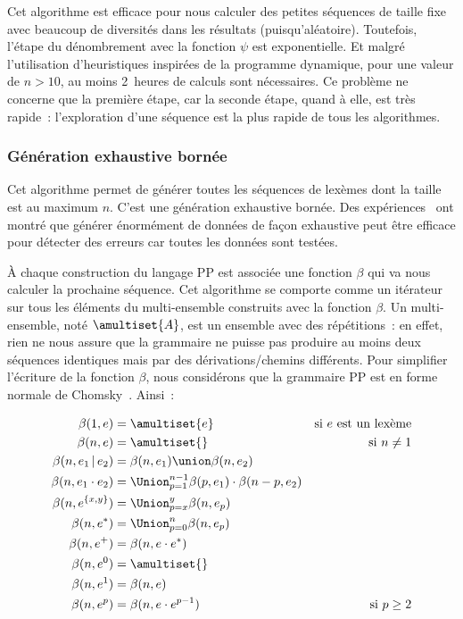 Cet algorithme est efficace pour nous calculer des petites séquences de taille
fixe avec beaucoup de diversités dans les résultats (puisqu'aléatoire).
Toutefois, l'étape du dénombrement avec la fonction $\psi$ est exponentielle. Et
malgré l'utilisation d'heuristiques inspirées de la programme dynamique, pour
une valeur de $n > 10$, au moins 2~heures de calculs sont nécessaires. Ce
problème ne concerne que la première étape, car la seconde étape, quand à elle,
est très rapide~: l'exploration d'une séquence est la plus rapide de tous les
algorithmes.

\subsubsection{Génération exhaustive bornée}
\label{subsection:data:bounded_exhaustive_generation}

Cet algorithme permet de générer toutes les séquences de lexèmes dont la taille
est au maximum $n$. C'est une génération exhaustive bornée. Des
expériences~ ont montré que générer énormément
de données de façon exhaustive peut être efficace pour détecter des erreurs car
toutes les données sont testées.

À chaque construction du langage PP est associée une fonction $\beta$ qui va
nous calculer la prochaine séquence. Cet algorithme se comporte comme un
itérateur sur tous les éléments du multi-ensemble construits avec la fonction
$\beta$. Un multi-ensemble, noté $\amultiset{A}$, est un ensemble avec des
répétitions~: en effet, rien ne nous assure que la grammaire ne puisse pas
produire au moins deux séquences identiques mais par des dérivations/chemins
différents. Pour simplifier l'écriture de la fonction $\beta$, nous considérons
que la grammaire PP est en forme normale de Chomsky~. Ainsi~:

\begin{align*}
%
\beta(1, e) & =
    \amultiset{e}
    &
    \text{si $e$ est un lexème}
    \\
%
\beta(n, e) & =
    \amultiset{}
    &
    \text{si $n \neq 1$}
    \\
%
\beta(n, e_1 \,\vert\, e_2) & =
    \beta(n, e_1) \union \beta(n, e_2)
    \\
%
\beta(n, e_1 \cdot e_2) & =
    \Union_{p = 1}^{n - 1}
    \beta(p, e_1) \cdot \beta(n - p, e_2)
    \\
%
\beta(n, e^{\{x, y\}}) & =
    \Union_{p = x}^y \beta(n, e_p)
    \\
%
\beta(n, e^*) & =
    \Union_{p = 0}^n \beta(n, e_p)
    \\
%
\beta(n, e^+) & =
    \beta(n, e \cdot e^*)
    \\
%
\beta(n, e^0) & =
    \amultiset{}
    \\
%
\beta(n, e^1) & =
    \beta(n, e)
    \\
%
\beta(n, e^p) & =
    \beta(n, e \cdot e^{p - 1})
    &
    \text{si $p \geq 2$}
%
\end{align*}

